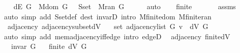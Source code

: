 \begin{isabellebody}
\isanewline
\ \ \isamarkupfalse%
\ {\isachardoublequoteopen}dE\ G\ {\isasymsubseteq}\ M{\isachardot}{\kern0pt}dom\ G\ {\isasymtimes}\ {\isasymUnion}\ {\isacharparenleft}{\kern0pt}S{\isachardot}{\kern0pt}set\ {\isacharbackquote}{\kern0pt}\ M{\isachardot}{\kern0pt}ran\ G{\isacharparenright}{\kern0pt}{\isachardoublequoteclose}\isanewline
\ \ \ \ \isamarkupfalse%
\ auto\isanewline
\ \ \isamarkupfalse%
\ {\isachardoublequoteopen}finite\ {\isachardot}{\kern0pt}{\isachardot}{\kern0pt}{\isachardot}{\kern0pt}{\isachardoublequoteclose}\isanewline
\ \ \ \ \isamarkupfalse%
\ assms\isanewline
\ \ \ \ \isamarkupfalse%
\ {\isacharparenleft}{\kern0pt}auto\ simp\ add{\isacharcolon}{\kern0pt}\ S{\isachardot}{\kern0pt}set{\isacharunderscore}{\kern0pt}def\ dest{\isacharcolon}{\kern0pt}\ invarD{\isacharparenleft}{\kern0pt}{}{\isacharparenright}{\kern0pt}\ intro{\isacharcolon}{\kern0pt}\ M{\isachardot}{\kern0pt}finite{\isacharunderscore}{\kern0pt}dom\ M{\isachardot}{\kern0pt}finite{\isacharunderscore}{\kern0pt}ran{\isacharparenright}{\kern0pt}\isanewline
{}\isamarkupfalse%
%
\endisatagproof
{\isafoldproof}%
%
\isadelimproof
\isanewline
%
\endisadelimproof
\isanewline
{}\isamarkupfalse%
\ {\isacharparenleft}{\kern0pt}\ adjacency{\isacharparenright}{\kern0pt}\ adjacency{\isacharunderscore}{\kern0pt}subset{\isacharunderscore}{\kern0pt}dV{\isacharcolon}{\kern0pt}\isanewline
\ \ \ {\isachardoublequoteopen}set\ {\isacharparenleft}{\kern0pt}adjacency{\isacharunderscore}{\kern0pt}list\ G\ v{\isacharparenright}{\kern0pt}\ {\isasymsubseteq}\ dV\ G{\isachardoublequoteclose}\isanewline
%
\isadelimproof
\ \ %
\endisadelimproof
%
\isatagproof
{}\isamarkupfalse%
\ {\isacharparenleft}{\kern0pt}auto\ simp\ add{\isacharcolon}{\kern0pt}\ mem{\isacharunderscore}{\kern0pt}adjacency{\isacharunderscore}{\kern0pt}iff{\isacharunderscore}{\kern0pt}edge\ intro{\isacharcolon}{\kern0pt}\ edgeD{\isacharparenleft}{\kern0pt}{}{\isacharparenright}{\kern0pt}{\isacharparenright}{\kern0pt}%
\endisatagproof
{\isafoldproof}%
%
\isadelimproof
\isanewline
%
\endisadelimproof
\isanewline
{}\isamarkupfalse%
\ {\isacharparenleft}{\kern0pt}\ adjacency{\isacharparenright}{\kern0pt}\ finite{\isacharunderscore}{\kern0pt}dV{\isacharcolon}{\kern0pt}\isanewline
\ \ \ {\isachardoublequoteopen}invar\ G{\isachardoublequoteclose}\isanewline
\ \ \ {\isachardoublequoteopen}finite\ {\isacharparenleft}{\kern0pt}dV\ G{\isacharparenright}{\kern0pt}{\isachardoublequoteclose}\isanewline

\end{isabellebody}

